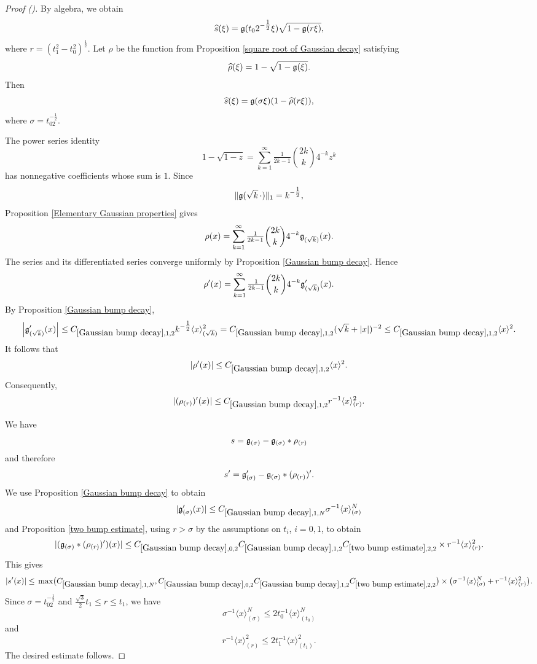 \documentclass[12pt,reqno]{amsart}
\newcommand{\auto}{{({\tiny\faCar})}}
\theoremstyle{plain}
\numberwithin{equation}{section}
\theoremstyle{remark}
\begin{document}
\begin{proof}[Proof \auto]
By algebra, we obtain
\[
\widehat{s}(\xi)
=
\mathfrak{g}(t_02^{-\tfrac12}\xi)\sqrt{1-\mathfrak{g}(r\xi)},
\]
where $r=(t_1^2-t_0^2)^{\frac12}$.
Let $\rho$ be the function from Proposition
\ref{square root of Gaussian decay} satisfying
\[
\widehat{\rho}(\xi)=1-\sqrt{1-\mathfrak{g}(\xi)}.
\]
Then
\[
\widehat{s}(\xi)
=
\mathfrak{g}(\sigma\xi)(1-\widehat{\rho}(r\xi)),
\]
where $\sigma=t_02^{-\frac12}$.

The power series identity
\[
1-\sqrt{1-z}
=
\sum_{k=1}^{\infty}
\tfrac{1}{2k-1}\binom{2k}{k}4^{-k}z^k
\]
has nonnegative coefficients whose sum is $1$. Since
\[
\|\mathfrak{g}(\sqrt{k}\,\cdot)\|_1=k^{-\tfrac12},
\]
Proposition \ref{Elementary Gaussian properties} gives
\[
\rho(x)
=
\sum_{k=1}^{\infty}
\tfrac{1}{2k-1}\binom{2k}{k}4^{-k}
\mathfrak{g}_{(\sqrt{k})}(x).
\]
The series and its differentiated series converge uniformly by
Proposition \ref{Gaussian bump decay}. Hence
\[
\rho'(x)
=
\sum_{k=1}^{\infty}
\tfrac{1}{2k-1}\binom{2k}{k}4^{-k}
\mathfrak{g}_{(\sqrt{k})}'(x).
\]
By Proposition \ref{Gaussian bump decay},
\[
\left|\mathfrak{g}_{(\sqrt{k})}'(x)\right|
\le
C_{\ref{Gaussian bump decay},1,2}
k^{-\tfrac12}\langle x\rangle_{(\sqrt{k})}^2
=
C_{\ref{Gaussian bump decay},1,2}
(\sqrt{k}+|x|)^{-2}
\le
C_{\ref{Gaussian bump decay},1,2}
\langle x\rangle^2.
\]
It follows that
\[
|\rho'(x)|
\le
C_{\ref{Gaussian bump decay},1,2}
\langle x\rangle^2.
\]
Consequently,
\[
|(\rho_{(r)})'(x)|
\le
C_{\ref{Gaussian bump decay},1,2}
r^{-1}\langle x\rangle_{(r)}^2.
\]

We have
\[
s=\mathfrak{g}_{(\sigma)}-\mathfrak{g}_{(\sigma)}*\rho_{(r)}
\]
and therefore
\[
s'=\mathfrak{g}_{(\sigma)}'
-\mathfrak{g}_{(\sigma)}*(\rho_{(r)})'.
\]
We use Proposition \ref{Gaussian bump decay} to obtain
\[
|\mathfrak{g}_{(\sigma)}'(x)|
\le
C_{\ref{Gaussian bump decay},1,N}
\sigma^{-1}\langle x\rangle_{(\sigma)}^N
\]
and Proposition \ref{two bump estimate}, using $r>\sigma$ by
the assumptions on $t_i$, $i=0,1$, to obtain
\[
|(\mathfrak{g}_{(\sigma)}*(\rho_{(r)})')(x)| \le{} C_{\ref{Gaussian bump decay},0,2} C_{\ref{Gaussian bump decay},1,2} C_{\ref{two bump estimate},2,2} \times r^{-1}\langle x\rangle_{(r)}^2.
\]
This gives
\[
|s'(x)| \le{} \max\bigl( C_{\ref{Gaussian bump decay},1,N}, C_{\ref{Gaussian bump decay},0,2} C_{\ref{Gaussian bump decay},1,2} C_{\ref{two bump estimate},2,2} \bigr) \times \bigl( \sigma^{-1}\langle x\rangle_{(\sigma)}^N + r^{-1}\langle x\rangle_{(r)}^2 \bigr).
\]
Since $\sigma=t_02^{-\frac12}$ and
$\frac{\sqrt{3}}{2}t_1\le r\le t_1$, we have
\[
\sigma^{-1}\langle x\rangle_{(\sigma)}^N
\le
2t_0^{-1}\langle x\rangle_{(t_0)}^N
\]
and
\[
r^{-1}\langle x\rangle_{(r)}^2
\le
2t_1^{-1}\langle x\rangle_{(t_1)}^2.
\]
The desired estimate follows.
\end{proof}
\end{document}
